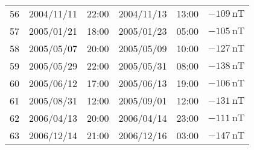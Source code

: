 \begin{table}[h]
\begin{adjustbox}{width=\textwidth,totalheight=0.9\textheight,keepaspectratio}
\begin{tabular}{cccccc}
    56 & 2004/11/11 & 22:00 & 2004/11/13 & 13:00 & $ \SI{-109}{\nano\tesla}$ \\
    57 & 2005/01/21 & 18:00 & 2005/01/23 & 05:00 & $ \SI{-105}{\nano\tesla}$ \\
    58 & 2005/05/07 & 20:00 & 2005/05/09 & 10:00 & $ \SI{-127}{\nano\tesla}$ \\
    59 & 2005/05/29 & 22:00 & 2005/05/31 & 08:00 & $ \SI{-138}{\nano\tesla}$ \\
    60 & 2005/06/12 & 17:00 & 2005/06/13 & 19:00 & $ \SI{-106}{\nano\tesla}$ \\
    61 & 2005/08/31 & 12:00 & 2005/09/01 & 12:00 & $ \SI{-131}{\nano\tesla}$ \\
    62 & 2006/04/13 & 20:00 & 2006/04/14 & 23:00 & $ \SI{-111}{\nano\tesla}$ \\
    63 & 2006/12/14 & 21:00 & 2006/12/16 & 03:00 & $ \SI{-147}{\nano\tesla}$ \\ \hline
    \end{tabular}%
    \end{adjustbox}
    \end{table}
    

%
%
